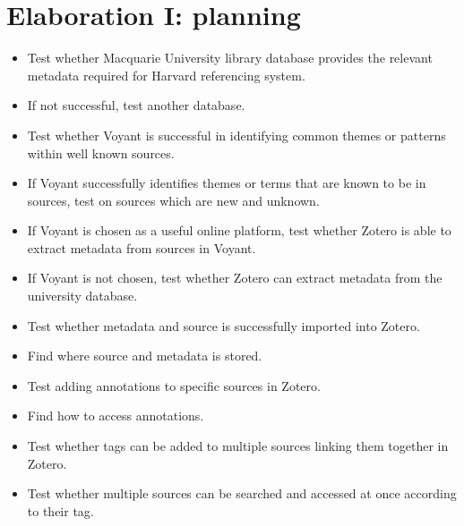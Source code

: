 \documentclass{article}
\begin{document}
\section{Elaboration I: planning }
\begin{itemize}
    \item Test whether Macquarie University library database provides the relevant metadata required for Harvard referencing system.
    \item If not successful, test another database. 
    \item Test whether Voyant is successful in identifying common themes or patterns within well known sources. 
    \item If Voyant successfully identifies themes or terms that are known to be in sources, test on sources which are new and unknown. 
    \item If Voyant is chosen as a useful online platform, test whether Zotero is able to extract metadata from sources in Voyant.
    \item If Voyant is not chosen, test whether Zotero can extract metadata from the university database. 
    \item Test whether metadata and source is successfully imported into Zotero.
    \item Find where source and metadata is stored.
    \item Test adding annotations to specific sources in Zotero.
    \item Find how to access annotations.
    \item Test whether tags can be added to multiple sources linking them together in Zotero.
    \item Test whether multiple sources can be searched and accessed at once according to their tag. 
\end{itemize}
\end{document}
